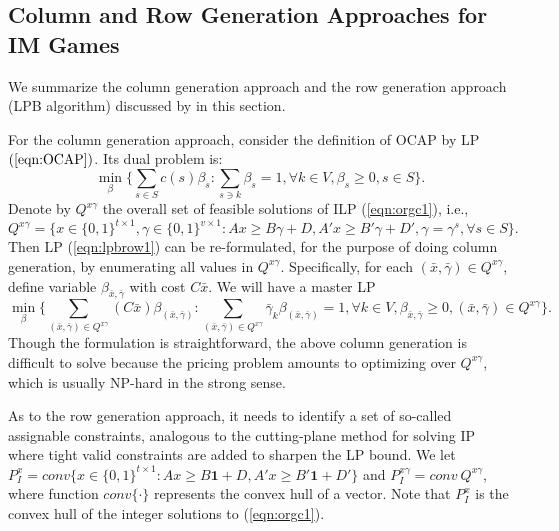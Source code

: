 \documentclass[ijoc,nonblindrev]{informs3-online-supplement} %
\begin{document}
\begin{APPENDICES}
\section{Column and Row Generation Approaches for IM Games} \label{section:LPBalgorithm}
We summarize the column generation approach and the row generation approach (LPB algorithm) discussed by \cite{Caprara2010LPB} in this section.

For the column generation approach, consider the definition of OCAP by LP $(\ref{eqn:OCAP})$. Its dual problem is:
\begin{equation}\label{eqn:lpbrow1}
\min_{\beta} \big\{ \sum_{s \in S}c(s)\beta_s:\sum_{s \ni k}\beta_s = 1,\forall k \in V,\beta_s \geq 0, s \in S \big\}.
\end{equation}
Denote by $Q^{x\gamma}$ the overall set of feasible solutions of ILP (\ref{eqn:orgc1}), i.e.,
$$
Q^{x\gamma} = \bigl\{ x \in \big\{0,1\big\}^{ t \times 1},\gamma \in \big\{0,1\big\}^{v \times 1}:Ax \geq B\gamma+D,A'x \geq B'\gamma+D',\gamma = \gamma^s,\forall s \in S  \bigr\}.$$
Then LP (\ref{eqn:lpbrow1}) can be re-formulated, for the purpose of doing   column generation, by enumerating all values in $Q^{x\gamma}$. Specifically,
for each $(\bar{x},\bar{\gamma}) \in Q^{x\gamma}$, define variable $\beta_{\bar{x},\bar{\gamma}}$ with cost $C\bar{x}$. We will have a master LP
\begin{equation}\label{eqn:lpbrow2}
\min_{\beta} \big\{ \sum_{(\bar{x},\bar{\gamma}) \in Q^{x\gamma}} (C\bar{x})\beta_{(\bar{x},\bar{\gamma})}: \sum_{(\bar{x},\bar{\gamma}) \in Q^{x\gamma}} \bar{\gamma}_k \beta_{(\bar{x},\bar{\gamma})}=1,\forall k \in V, \beta_{\bar{x},\bar{\gamma}}\geq 0, (\bar{x},\bar{\gamma})\in Q^{x\gamma} \big\}.
\end{equation}
Though the formulation is straightforward, the above column generation is difficult to solve because the pricing problem amounts to optimizing over $Q^{x\gamma}$, which is usually NP-hard in the strong sense.


As to the row generation approach, it needs to identify a set of so-called assignable constraints, analogous to the cutting-plane method for solving IP where tight valid constraints are added to sharpen the LP bound. We let $P_I^x = conv \big\{ x \in \big\{0,1\big\}^{ t \times 1}:Ax \geq B\textbf{1}+D,A'x \geq B'\textbf{1}+D'  \big\}$ and $P_{I}^{x\gamma} = conv ~Q^{x\gamma}$, where function $conv\{\cdot\}$ represents the convex hull of a vector. Note that $P_I^x$ is the convex hull of the integer solutions to (\ref{eqn:orgc1}).



\end{APPENDICES}
\end{document}
